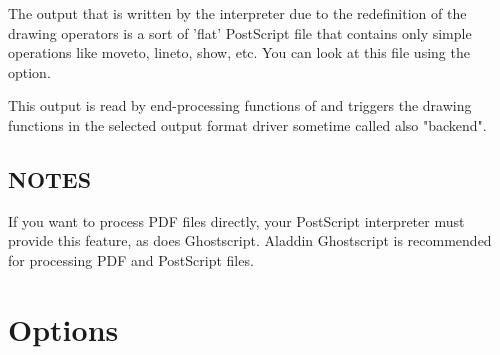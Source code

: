\documentclass[english,a4paper]{article}
\begin{document}
The output that is written by the interpreter due to the redefinition of the
drawing operators is a sort of 'flat' PostScript file that contains only simple
operations like moveto, lineto, show, etc. You can look at this file using the
 option.

This output is read by end-processing functions of  and triggers
the drawing functions in the selected output format driver sometime called also "backend".

\subsection{NOTES}

If you want to process PDF files directly, your PostScript interpreter must
provide this feature, as does Ghostscript. Aladdin Ghostscript is
recommended for processing PDF and PostScript files.

\section{Options}
\end{document}
